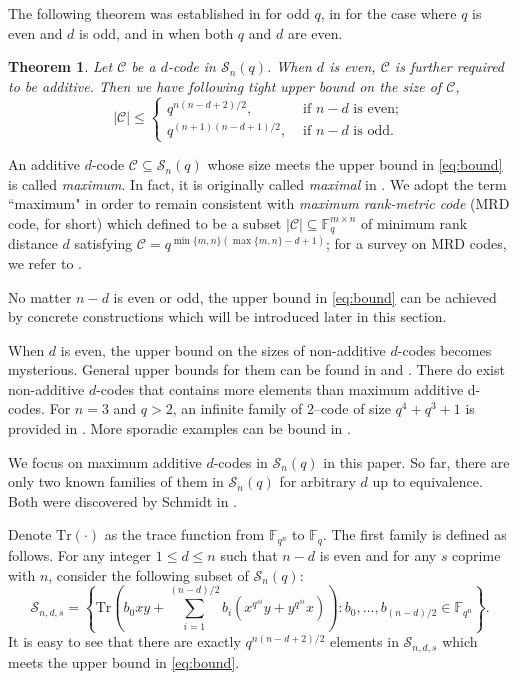 \documentclass{amsart}
\theoremstyle{plain}
\newtheorem{theorem}{Theorem}[section]
\theoremstyle{definition}
\newcommand{\F}{\mathbb F}
\newcommand{\fqn}{\mathbb{F}_{q^n}}
\newcommand{\cS}{\mathcal S}
\newcommand{\cC}{\mathcal C}
\newcommand{\sS}{\mathscr S}
\newcommand{\Tr}{ \ensuremath{ \mathrm{Tr}}}
\begin{document}
	
	The following theorem was established in \cite{Schmidt_2015} for odd $q$, in \cite{Schmidt_2010} for the case where $q$ is even and $d$ is odd, and in \cite{Schmidt_2020} when both $q$ and $d$ are even.
	\begin{theorem}\label{the1.2}
		Let $\cC$ be a $d$-code in $\sS_n(q)$. When $d$ is even, $\cC$ is further required to be additive. Then we have following tight upper bound on the size of $\cC$,
		\begin{equation}\label{eq:bound}
			\mid\cC\mid\leq	
			\begin{cases}
				q^{n(n-d+2)/2}, & \text{ if }n-d\text{ is even};\\
				q^{(n+1)(n-d+1)/2}, & \text{ if }n-d\text{ is odd}.
			\end{cases}
		\end{equation}
	\end{theorem}
	An additive $d$-code $\cC\subseteq \sS_n(q)$ whose size meets the upper bound in \eqref{eq:bound} is called \emph{maximum}. In fact, it is originally called \emph{maximal} in \cite{Schmidt_2010,Schmidt_2015,Schmidt_2020}. We adopt the term ``maximum" in order to remain consistent with \emph{maximum rank-metric code} (MRD code, for short) which defined to be a subset $|\cC|\subseteq \F_{q}^{m\times n}$ of minimum rank distance $d$ satisfying $\cC=q^{\min\{m,n\}(\max\{m,n\}-d+1)}$; for a survey on MRD codes, we refer to \cite{sheekey_MRD_survey}.
	
	No matter $n-d$ is even or odd, the upper bound in \eqref{eq:bound} can be achieved by concrete constructions which will be introduced later in this section.
	
	When $d$ is even, the upper bound on the sizes of non-additive $d$-codes becomes mysterious. General upper bounds for them can be found in \cite[Proposition 3.7]{Schmidt_2015} and \cite[Proposition 3.4]{RMC}. There do exist non-additive $d$-codes that contains more elements than maximum additive d-codes. For $n=3$ and $q > 2$, an infinite family of $2$–code of size $q^4 + q^3 + 1$ is provided in \cite{cossidente_symmetric_2022}. More sporadic examples can be bound in \cite[Table 2 and Table 9]{RMC}.
	
	We focus on maximum additive $d$-codes in $\sS_n(q)$ in this paper.
	So far,  there are only two known families of them in $\sS_n(q)$ for arbitrary $d$ up to equivalence. Both were discovered by Schmidt in \cite{Schmidt_2010,Schmidt_2015}.
	
	Denote \( \Tr(\cdot) \) as the trace function from \( \mathbb{F}_{q^n} \) to \( \mathbb{F}_q \).
	The first family is defined as follows. For any integer $1\leq d\leq n$ such that $n-d$ is even and for any $s$ coprime with $n$, consider the following subset of $\sS_n(q)$:
	\begin{equation}\label{eq:S_1}
		\cS_{n,d,s}=\left\{\Tr\left(b_0xy+\sum_{i=1}^{(n-d)/2}b_i\left(x^{q^{si}}y+y^{q^{si}}x\right)\right): b_0,\dots,b_{(n-d)/2}\in\fqn \right\}.	
	\end{equation}
	It is easy to see that there are exactly $q^{n(n-d+2)/2}$ elements in $\cS_{n,d,s}$ which meets the upper bound in \eqref{eq:bound}.
	
\end{document}
